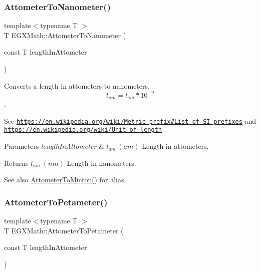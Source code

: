 \subsubsection{\texorpdfstring{Attometer\+To\+Nanometer()}{AttometerToNanometer()}}
{\footnotesize\ttfamily template$<$typename T $>$ \\
T E\+G\+X\+Math\+::\+Attometer\+To\+Nanometer (\begin{DoxyParamCaption}\item[{const T}]{length\+In\+Attometer }\end{DoxyParamCaption})}



Converts a length in attometers to nanometers. \[ l_{nm}=l_{am} * 10^{-9} \]. 

See \href{https://en.wikipedia.org/wiki/Metric_prefix#List_of_SI_prefixes}{\tt https\+://en.\+wikipedia.\+org/wiki/\+Metric\+\_\+prefix\#\+List\+\_\+of\+\_\+\+S\+I\+\_\+prefixes} and \href{https://en.wikipedia.org/wiki/Unit_of_length}{\tt https\+://en.\+wikipedia.\+org/wiki/\+Unit\+\_\+of\+\_\+length} 
\begin{DoxyParams}{Parameters}
{\em length\+In\+Attometer} & $ l_{am}\ (am)$ Length in attometers. \\
\hline
\end{DoxyParams}
\begin{DoxyReturn}{Returns}
$ l_{nm}\ (nm)$ Length in nanometers. 
\end{DoxyReturn}
\begin{DoxySeeAlso}{See also}
\mbox{\hyperlink{group___e_g_x_math-_conversions-_length_conversions-_attometer-_non-_s_i_ga9aaf945221fbc8d469121e0fd0980b41}{Attometer\+To\+Micron()}} for alias. 
\end{DoxySeeAlso}
\mbox{\label{group___e_g_x_math-_conversions-_length_conversions-_attometer-_s_i_ga780e4aa3b174598a72aefa3bdd960447}} 
\subsubsection{\texorpdfstring{Attometer\+To\+Petameter()}{AttometerToPetameter()}}
{\footnotesize\ttfamily template$<$typename T $>$ \\
T E\+G\+X\+Math\+::\+Attometer\+To\+Petameter (\begin{DoxyParamCaption}\item[{const T}]{length\+In\+Attometer }\end{DoxyParamCaption})}



